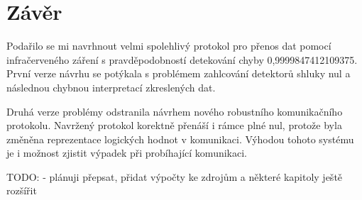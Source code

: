 \chapter{Závěr}

Podařilo se mi navrhnout velmi spolehlivý protokol pro přenos dat pomocí infračerveného záření s pravděpodobností detekování chyby 0,9999847412109375. První verze návrhu se potýkala s problémem zahlcování detektorů shluky nul a následnou chybnou interpretací zkreslených dat.

Druhá verze problémy odstranila návrhem nového robustního komunikačního protokolu. Navržený protokol korektně přenáší i rámce plné nul, protože byla změněna reprezentace logických hodnot v komunikaci. Výhodou tohoto systému je i možnost zjistit výpadek při probíhající komunikaci.

TODO: - plánuji přepsat, přidat výpočty ke zdrojům a některé kapitoly ještě rozšířit
